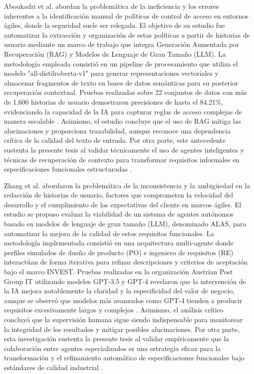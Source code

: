 Aboukadri et al. \cite{Aboukadri2025} abordan la problemática de la ineficiencia y los errores inherentes a la identificación manual de políticas de 
control de acceso en entornos ágiles, donde la seguridad suele ser relegada. El objetivo de su estudio fue automatizar la extracción y organización de 
estas políticas a partir de historias de usuario mediante un marco de trabajo que integra Generación Aumentada por Recuperación (RAG) y Modelos de 
Lenguaje de Gran Tamaño (LLM). La metodología empleada consistió en un pipeline de procesamiento que utiliza el modelo "all-distilroberta-v1" para 
generar representaciones vectoriales y almacenar fragmentos de texto en bases de datos semánticas para su posterior recuperación contextual. Pruebas 
realizadas sobre 22 conjuntos de datos con más de 1,600 historias de usuario demostraron precisiones de hasta el 84.21\%, evidenciando la capacidad de 
la IA para capturar reglas de acceso complejas de manera escalable \cite{Aboukadri2025}. Asimismo, el estudio concluye que el uso de RAG mitiga las 
alucinaciones y proporciona trazabilidad, aunque reconoce una dependencia crítica de la calidad del texto de entrada. Por otra parte, este antecedente 
sustenta la presente tesis al validar técnicamente el uso de agentes inteligentes y técnicas de recuperación de contexto para transformar requisitos 
informales en especificaciones funcionales estructuradas \cite{Aboukadri2025}.


Zhang et al. \cite{Zhang2024} abordaron la problemática de la inconsistencia y la ambigüedad en la redacción de historias de usuario, factores que 
comprometen la velocidad del desarrollo y el cumplimiento de las expectativas del cliente en marcos ágiles. El estudio se propuso evaluar la viabilidad 
de un sistema de agentes autónomos basado en modelos de lenguaje de gran tamaño (LLM), denominado ALAS, para automatizar la mejora de la calidad de estos 
requisitos funcionales. La metodología implementada consistió en una arquitectura multi-agente donde perfiles simulados de dueño de producto (PO) e 
ingeniero de requisitos (RE) interactúan de forma iterativa para refinar descripciones y criterios de aceptación bajo el marco INVEST. Pruebas realizadas 
en la organización Austrian Post Group IT utilizando modelos GPT-3.5 y GPT-4 revelaron que la intervención de la IA mejora notablemente la claridad y 
la especificidad del valor de negocio, aunque se observó que modelos más avanzados como GPT-4 tienden a producir requisitos excesivamente largos y 
complejos \cite{Zhang2024}. Asimismo, el análisis crítico concluyó que la supervisión humana sigue siendo indispensable para monitorear la integridad 
de los resultados y mitigar posibles alucinaciones. Por otra parte, esta investigación sustenta la presente tesis al validar empíricamente que la 
colaboración entre agentes especializados es una estrategia eficaz para la transformación y el refinamiento automático de especificaciones funcionales 
bajo estándares de calidad industrial \cite{Zhang2024}.

